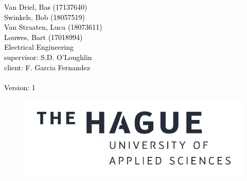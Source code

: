 \begin{titlepage}
\begin{flushleft}
        \Large
        \hspace{\kantlinebreedte}
        \textcolor{black}{Van Driel, Bas (17137640)\\}
        \hspace{\kantlinebreedte}
        \textcolor{black}{Swinkels, Bob (18057519)\\}
        \hspace{\kantlinebreedte}
        \textcolor{black}{Van Straaten, Luca (18073611)\\}
        \hspace{\kantlinebreedte}
        \textcolor{black}{Louwes, Bart (17018994)\\}
        \hspace{\kantlinebreedte}
        \textcolor{black}{Electrical Engineering\\}
        \hspace{\kantlinebreedte}
        \textcolor{black}{supervisor: S.D. O’Loughlin\\}
        \hspace{\kantlinebreedte}
        \textcolor{black}{client: F. Garcia Fernandez\\}
        \hspace{\kantlinebreedte}
        \textcolor{black}{\dedatum \\}
        \hspace{\kantlinebreedte}
        \textcolor{black}{Version: 1}
        
        
        \end{flushleft}
        
        \begin{figure}[h]
        \centering
        \includegraphics[right, scale=0.83]{cover/logo_black.pdf}
        \end{figure}




\end{titlepage}
